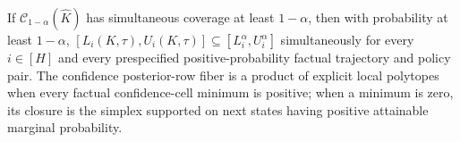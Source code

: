 If \(\mathcal C_{1-\alpha}(\widehat K)\) has simultaneous coverage at least \(1-\alpha\), then with probability at least \(1-\alpha\), \([L_i(K,\tau),U_i(K,\tau)]\subseteq[L_i^{\alpha},U_i^{\alpha}]\) simultaneously for every \(i\in[H]\) and every prespecified positive-probability factual trajectory and policy pair. The confidence posterior-row fiber is a product of explicit local polytopes when every factual confidence-cell minimum is positive; when a minimum is zero, its closure is the simplex supported on next states having positive attainable marginal probability.
